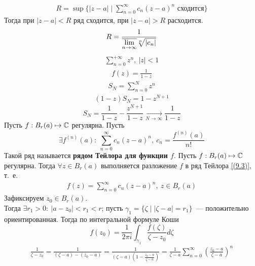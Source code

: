 \begin{align*}
  R = \sup\{\left| z-a \right|\mid \sum_{n=0}^{\infty}c_n(z-a)^n \text{ сходится}\}
\end{align*}
Тогда при $\left| z-a \right|<R$ ряд сходится, при $\left| z-a \right|>R$
расходится.
\begin{align*}
  R = \frac{1}{\overline{\displaystyle \lim_{n \to \infty}} \sqrt[n]{\left| c_n \right|}}
\end{align*}
\example
\begin{align*}
  \sum_{n=0}^{+\infty}z^n, \ \left| z \right|< 1
\end{align*}
\begin{align*}
  f(z) = \frac{1}{1-z}
\end{align*}
\begin{align*}
  S_N = \sum_{n=0}^Nz^n
\end{align*}
\begin{align*}
  (1-z)S_N = 1- z^{N+1}
\end{align*}
\begin{equation}\label{(9.2)}
  S_N = \frac{1}{1-z} - \frac{z^{N+1}}{1-z} \underset{N \to \infty}{\to} \frac{1}{1-z}
\end{equation}
\Def
Пусть $f: B_r(a) \mapsto \mathbb{C}$ регулярна. Пусть
\begin{equation}\label{(9.3)}
    \exists f^{(n)}(a): \ \sum_{n=0}^{\infty}c_n(z-a)^n, \ c_n = \frac{f^{(n)}(a)}{n!}
\end{equation}
Такой ряд называется \textbf{рядом Тейлора для функции $f$}.
\theorem
Пусть $f: B_r(a) \mapsto \mathbb{C}$ регулярна. Тогда $\forall z \in B_r(a)$
выполняется разложение $f$ в ряд Тейлора \eqref{(9.3)}, т.~е.
\begin{align*}
  f(z)= \sum_{n=0}^{\infty}c_n(z-a)^n, \ z \in B_r(a)
\end{align*}
\pr
Зафиксируем $z_0 \in B_r(a)$.
\\
Тогда $\exists r_1 > 0: \ \left| a-z_0 \right|<r_1<r$; пусть $\gamma_1 = \{\zeta
\mid \left| \zeta - a \right| = r_1\}$~--- положительно ориентированная. Тогда
по интегральной формуле Коши
\begin{equation}\label{(9.4)}
  f(z_0) = \frac{1}{2 \pi i} \int_{\gamma_1}\frac{f(\zeta)}{\zeta - z_0} d \zeta 
\end{equation}
\begin{align*}
  \frac{1}{\zeta - z_0} = \frac{1}{(\zeta - a) - (z_0 - a)} = \frac{1}{(\zeta - a)\left( 1-\frac{z_0-a}{\zeta - a} \right)} = \frac{1}{\zeta - a} \sum_{n=0}^{\infty}\left( \frac{z_0-a}{\zeta - a} \right)^n
\end{align*}
